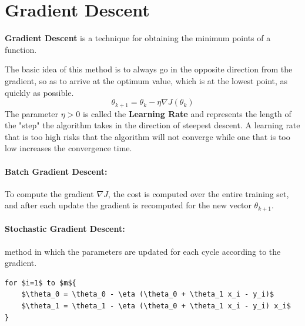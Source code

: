 \section{Gradient Descent}

\begin{mdframed}
    \textbf{Gradient Descent} is a technique for obtaining the minimum points of a function.
\end{mdframed}
 The basic idea of this method is to always go in the opposite direction from the gradient, so as to arrive at the optimum value, which is at the lowest point, as quickly as possible.
\begin{equation} \tag{Gradient Descent}
    \theta_{k+1} = \theta_k - \eta \nabla J(\theta_k)
\end{equation}
The parameter $\eta>0$ is called the \textbf{Learning Rate} and represents the length of the "step" the algorithm takes in the direction of steepest descent.
A learning rate that is too high risks that the algorithm will not converge while one that is too low increases the convergence time.
\paragraph{Batch Gradient Descent:} To compute the gradient $\nabla J$, the cost is computed over the entire training set, and after each update the gradient is recomputed for the new vector $\theta_{k+1}$.
\paragraph{Stochastic Gradient Descent:} method in which the parameters are updated for each cycle according to the gradient.
\begin{lstlisting}[mathescape=true]
for $i=1$ to $m${
    $\theta_0 = \theta_0 - \eta (\theta_0 + \theta_1 x_i - y_i)$
    $\theta_1 = \theta_1 - \eta (\theta_0 + \theta_1 x_i - y_i) x_i$
}
\end{lstlisting}

